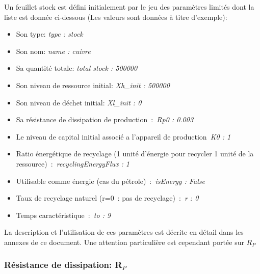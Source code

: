 \documentclass[12pt,a4paper]{article}%
\begin{document}
Un feuillet stock est défini initialement par le jeu des paramètres
limités dont la liste est donnée ci-dessous (Les valeurs sont données à
titre d'exemple):

\begin{itemize}
\item Son type: \textit{type : stock}

\item Son nom: \textit{name : cuivre}

\item Sa quantité totale: \textit{total stock : 500000}

\item Son niveau de ressource initial: \textit{Xh\_init : 500000}

\item Son niveau de déchet initial: \textit{Xl\_init : 0}

\item Sa résistance de dissipation de production~:\textit{\ Rp0 : 0.003}

\item Le niveau de capital initial associé a l'appareil de
production\textit{\ K0 : 1}

\item Ratio énergétique de recyclage (1 unité d'énergie pour recycler 1 unité
de la ressource)~:\textit{\ recyclingEnergyFlux : 1}

\item Utilisable comme énergie (cas du pétrole)~:\textit{\ isEnergy : False}

\item Taux de recyclage naturel (r=0~: pas de recyclage)~:\textit{\ r : 0}

\item Temps caractéristique~:\textit{\ to : 9}
\end{itemize}

La description et l'utilisation de ces paramètres est décrite en détail
dans les annexes de ce document. Une attention particulière est cependant
portée sur $R_{P}$

\subsubsection{Résistance de dissipation: R$_{P}$}
\end{document}

